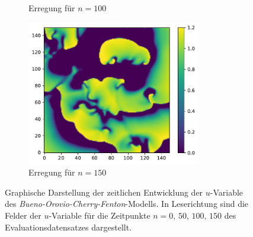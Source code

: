 \begin{appendices}
\begin{figure}[h]
\begin{subfigure}{.5\textwidth}
		\setcapmargin[1cm]{0.5cm}
		\caption{Erregung für $n=100$}
	\end{subfigure}%
	\begin{subfigure}{.5\textwidth}
		\centering
		\includegraphics[height=2.5in]{figures/results/dynamics/bocf_150.pdf}
		\setcapmargin[1cm]{0.5cm}
		\caption{Erregung für $n=150$}
	\end{subfigure}
	\caption{Graphische Darstellung der zeitlichen Entwicklung der $u$-Variable des \textit{Bueno-Orovio-Cherry-Fenton}-Modells. In Leserichtung sind die Felder der $u$-Variable für die Zeitpunkte $n=0,\, 50,\, 100,\, 150$ des Evaluationsdatensatzes dargestellt.}
	\label{fig:apx_bocf_evolution}
\end{figure} 


\end{appendices}
